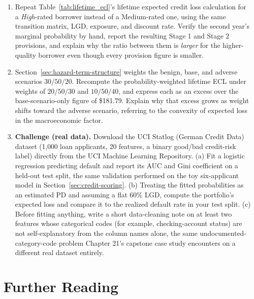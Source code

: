 \documentclass[../ai_in_finance]{subfiles}
\begin{document}
\begin{enumerate}
    \item Repeat Table~\ref{tab:lifetime_ecl}'s lifetime expected credit loss calculation for a \emph{High}-rated borrower instead of a Medium-rated one, using the same transition matrix, LGD, exposure, and discount rate. Verify the second year's marginal probability by hand, report the resulting Stage 1 and Stage 2 provisions, and explain why the ratio between them is \emph{larger} for the higher-quality borrower even though every provision figure is smaller.
    \item Section~\ref{sec:hazard-term-structure} weights the benign, base, and adverse scenarios $30/50/20$. Recompute the probability-weighted lifetime ECL under weights of $20/50/30$ and $10/50/40$, and express each as an excess over the base-scenario-only figure of \$181.79. Explain why that excess grows as weight shifts toward the adverse scenario, referring to the convexity of expected loss in the macroeconomic factor.
    \item \textbf{Challenge (real data).} Download the UCI Statlog (German Credit Data) dataset (1,000 loan applicants, 20 features, a binary good/bad credit-risk label) directly from the UCI Machine Learning Repository. (a) Fit a logistic regression predicting default and report its AUC and Gini coefficient on a held-out test split, the same validation performed on the toy six-applicant model in Section~\ref{sec:credit-scoring}. (b) Treating the fitted probabilities as an estimated PD and assuming a flat $60\%$ LGD, compute the portfolio's expected loss and compare it to the realized default rate in your test split. (c) Before fitting anything, write a short data-cleaning note on at least two features whose categorical codes (for example, checking-account status) are not self-explanatory from the column names alone, the same undocumented-category-code problem Chapter 21's capstone case study encounters on a different real dataset entirely.
\end{enumerate}

\section{Further Reading}
\end{document}
